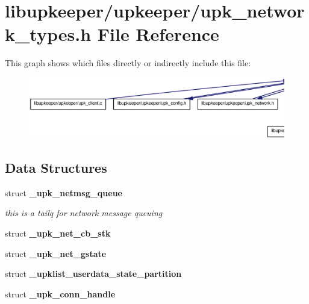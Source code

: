 \section{libupkeeper/upkeeper/upk\_\-network\_\-types.h File Reference}
\label{upk__network__types_8h}
This graph shows which files directly or indirectly include this file:
\nopagebreak
\begin{figure}[H]
\begin{center}
\leavevmode
\includegraphics[width=400pt]{upk__network__types_8h__dep__incl}
\end{center}
\end{figure}
\subsection*{Data Structures}
\begin{DoxyCompactItemize}
\item 
struct {\bf \_\-upk\_\-netmsg\_\-queue}
\begin{DoxyCompactList}\small\item\em this is a tailq for network message queuing \end{DoxyCompactList}\item 
struct {\bf \_\-upk\_\-net\_\-cb\_\-stk}
\item 
struct {\bf \_\-upk\_\-net\_\-gstate}
\item 
struct {\bf \_\-upklist\_\-userdata\_\-state\_\-partition}
\item 
struct {\bf \_\-upk\_\-conn\_\-handle}
\end{DoxyCompactItemize}
